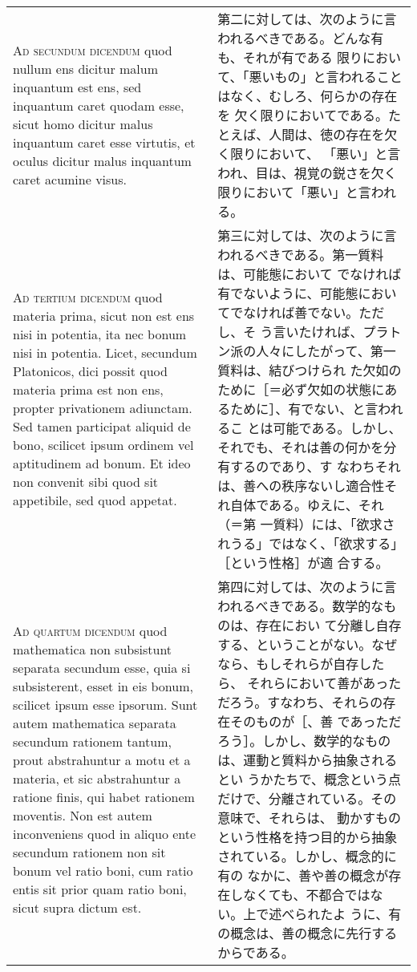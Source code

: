 \documentclass[10pt]{jsarticle}
\begin{document}
\begin{longtable}{p{21em}p{21em}}
\\


{\scshape Ad secundum dicendum} quod nullum ens dicitur malum inquantum est
 ens, sed inquantum caret quodam esse, sicut homo dicitur malus
 inquantum caret esse virtutis, et oculus dicitur malus inquantum caret
 acumine visus.

&

第二に対しては、次のように言われるべきである。どんな有も、それが有である
 限りにおいて、「悪いもの」と言われることはなく、むしろ、何らかの存在を
 欠く限りにおいてである。たとえば、人間は、徳の存在を欠く限りにおいて、
 「悪い」と言われ、目は、視覚の鋭さを欠く限りにおいて「悪い」と言われる。

\\



{\scshape Ad tertium dicendum} quod materia prima, sicut non est ens nisi in
 potentia, ita nec bonum nisi in potentia. Licet, secundum Platonicos,
 dici possit quod materia prima est non ens, propter privationem
 adiunctam. Sed tamen participat aliquid de bono, scilicet ipsum ordinem
 vel aptitudinem ad bonum. Et ideo non convenit sibi quod sit
 appetibile, sed quod appetat.

&

第三に対しては、次のように言われるべきである。第一質料は、可能態において
 でなければ有でないように、可能態においてでなければ善でない。ただし、そ
 う言いたければ、プラトン派の人々にしたがって、第一質料は、結びつけられ
 た欠如のために［＝必ず欠如の状態にあるために］、有でない、と言われるこ
 とは可能である。しかし、それでも、それは善の何かを分有するのであり、す
 なわちそれは、善への秩序ないし適合性それ自体である。ゆえに、それ（＝第
 一質料）には、「欲求されうる」ではなく、「欲求する」［という性格］が適
 合する。


\\

{\scshape Ad quartum dicendum} quod mathematica non subsistunt separata
 secundum esse, quia si subsisterent, esset in eis bonum, scilicet ipsum
 esse ipsorum. Sunt autem mathematica separata secundum rationem tantum,
 prout abstrahuntur a motu et a materia, et sic abstrahuntur a ratione
 finis, qui habet rationem moventis. Non est autem inconveniens quod in
 aliquo ente secundum rationem non sit bonum vel ratio boni, cum ratio
 entis sit prior quam ratio boni, sicut supra dictum est.

&

第四に対しては、次のように言われるべきである。数学的なものは、存在におい
 て分離し自存する、ということがない。なぜなら、もしそれらが自存したら、
 それらにおいて善があっただろう。すなわち、それらの存在そのものが［、善
 であっただろう］。しかし、数学的なものは、運動と質料から抽象されるとい
 うかたちで、概念という点だけで、分離されている。その意味で、それらは、
 動かすものという性格を持つ目的から抽象されている。しかし、概念的に有の
 なかに、善や善の概念が存在しなくても、不都合ではない。上で述べられたよ
 うに、有の概念は、善の概念に先行するからである。

\end{longtable}
\end{document}
